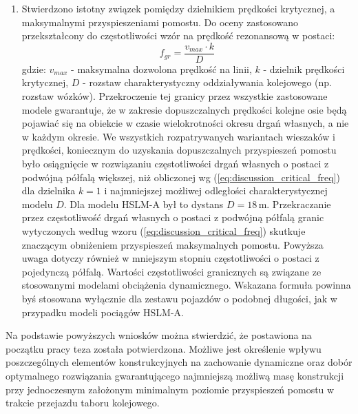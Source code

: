 \begin{enumerate}
\item Stwierdzono istotny związek pomiędzy dzielnikiem prędkości krytycznej, a maksymalnymi przyspieszeniami pomostu. Do oceny zastosowano przekształcony do częstotliwości wzór na prędkość rezonansową w postaci:
\begin{equation} \label{eq:discussion_critical_freq}
	f_{gr} = \frac{v_{max}\cdot k}{D} 
\end{equation}
gdzie: $v_{max}$ - maksymalna dozwolona prędkość na linii, $k$ - dzielnik prędkości krytycznej, $D$ - rozstaw charakterystyczny oddziaływania kolejowego (np. rozstaw wózków). Przekroczenie tej granicy przez wszystkie zastosowane modele gwarantuje, że w zakresie dopuszczalnych prędkości kolejne osie będą pojawiać się na obiekcie w czasie wielokrotności okresu drgań własnych, a nie w każdym okresie. We wszystkich rozpatrywanych wariantach wieszaków i prędkości, koniecznym do uzyskania dopuszczalnych przyspieszeń pomostu było osiągnięcie w rozwiązaniu częstotliwości drgań własnych o postaci z podwójną półfalą większej, niż obliczonej wg (\ref{eq:discussion_critical_freq}) dla dzielnika $k=1$ i najmniejszej możliwej odległości charakterystycznej modelu $D$. Dla modelu HSLM-A był to dystans $D=18\,\mathrm{m}$. Przekraczanie przez częstotliwość drgań własnych o postaci z podwójną półfalą granic wytyczonych według wzoru (\ref{eq:discussion_critical_freq}) skutkuje znaczącym obniżeniem przyspieszeń maksymalnych pomostu. Powyższa uwaga dotyczy również w mniejszym stopniu częstotliwości o postaci z pojedynczą półfalą. Wartości częstotliwości granicznych są związane ze stosowanymi modelami obciążenia dynamicznego. Wskazana formuła powinna byś stosowana wyłącznie dla zestawu pojazdów o podobnej długości, jak w przypadku modeli pociągów HSLM-A.




\end{enumerate}

Na podstawie powyższych wniosków można stwierdzić, że postawiona na początku pracy teza została potwierdzona. Możliwe jest określenie wpływu poszczególnych elementów konstrukcyjnych na zachowanie dynamiczne oraz dobór optymalnego rozwiązania gwarantującego najmniejszą możliwą masę konstrukcji przy jednoczesnym założonym minimalnym poziomie przyspieszeń pomostu w trakcie przejazdu taboru kolejowego.


